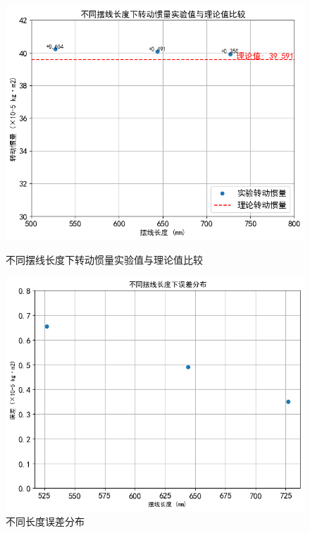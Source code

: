 \documentclass{article}
\begin{document}
\begin{figure}[h!]
    \centering
    \begin{minipage}{0.48\textwidth}
        \centering
        \includegraphics[width=\textwidth]{不同摆线长度下转动惯量实验值与理论值比较.png}
        \caption{不同摆线长度下转动惯量实验值与理论值比较}
        \label{fig:comparison_theory_experiment}
    \end{minipage}
    \hfill
    \begin{minipage}{0.48\textwidth}
        \centering
        \includegraphics[width=\textwidth]{不同长度误差分布.png}
        \caption{不同长度误差分布}
        \label{fig:error_distribution}
    \end{minipage}
\end{figure}
\end{document}
